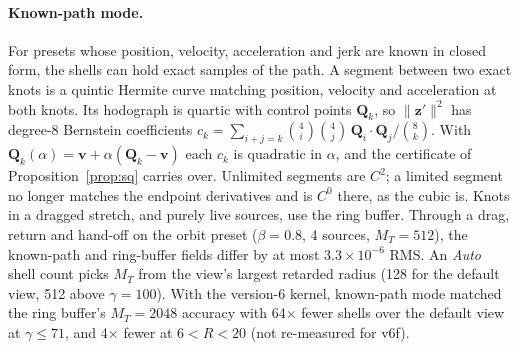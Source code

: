 \documentclass[11pt, a4paper]{article}
\begin{document}
\paragraph{Known-path mode.} For presets whose position, velocity, acceleration and jerk are known in closed form, the shells can hold exact samples of the path. A segment between two exact knots is a quintic Hermite curve matching position, velocity and acceleration at both knots. Its hodograph is quartic with control points $\mathbf{Q}_k$, so $\|\mathbf{z}'\|^2$ has degree-8 Bernstein coefficients $c_k = \sum_{i+j=k} \binom{4}{i}\binom{4}{j}\,\mathbf{Q}_i\cdot\mathbf{Q}_j \big/ \binom{8}{k}$. With $\mathbf{Q}_k(\alpha) = \mathbf{v} + \alpha(\mathbf{Q}_k - \mathbf{v})$ each $c_k$ is quadratic in $\alpha$, and the certificate of Proposition~\ref{prop:sq} carries over. Unlimited segments are $C^2$; a limited segment no longer matches the endpoint derivatives and is $C^0$ there, as the cubic is. Knots in a dragged stretch, and purely live sources, use the ring buffer. Through a drag, return and hand-off on the orbit preset ($\beta = 0.8$, 4 sources, $M_T = 512$), the known-path and ring-buffer fields differ by at most $3.3\times10^{-6}$ RMS. An \emph{Auto} shell count picks $M_T$ from the view's largest retarded radius (128 for the default view, 512 above $\gamma = 100$). With the version-6 kernel, known-path mode matched the ring buffer's $M_T = 2048$ accuracy with 64$\times$ fewer shells over the default view at $\gamma \le 71$, and 4$\times$ fewer at $6 < R < 20$ (not re-measured for v6f).
\end{document}
